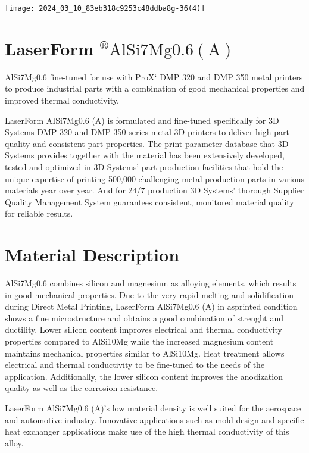 \documentclass[10pt]{article}
\begin{document}
\begin{center}
\texttt{[image: 2024\_03\_10\_83eb318c9253c48ddba8g-36(4)]}
\end{center}

\section*{LaserForm ${ }^{\circledR} \mathrm{AlSi7Mg0.6}(\mathrm{A})$}
AlSi7Mg0.6 fine-tuned for use with ProX` DMP 320 and DMP 350 metal printers to produce industrial parts with a combination of good mechanical properties and improved thermal conductivity.

LaserForm AISi7Mg0.6 (A) is formulated and fine-tuned specifically for 3D Systems DMP 320 and DMP 350 series metal 3D printers to deliver high part quality and consistent part properties. The print parameter database that 3D Systems provides together with the material has been extensively developed, tested and optimized in 3D Systems' part production facilities that hold the unique expertise of printing 500,000 challenging metal production parts in various materials year over year. And for 24/7 production 3D Systems' thorough Supplier Quality Management System guarantees consistent, monitored material quality for reliable results.

\section*{Material Description}
AlSi7Mg0.6 combines silicon and magnesium as alloying elements, which results in good mechanical properties. Due to the very rapid melting and solidification during Direct Metal Printing, LaserForm AlSi7Mg0.6 (A) in asprinted condition shows a fine microstructure and obtains a good combination of strenght and ductility. Lower silicon content improves electrical and thermal conductivity properties compared to AlSi10Mg while the increased magnesium content maintains mechanical properties similar to AlSi10Mg. Heat treatment allows electrical and thermal conductivity to be fine-tuned to the needs of the application. Additionally, the lower silicon content improves the anodization quality as well as the corrosion resistance.

LaserForm AlSi7Mg0.6 (A)'s low material density is well suited for the aerospace and automotive industry. Innovative applications such as mold design and specific heat exchanger applications make use of the high thermal conductivity of this alloy.
\end{document}
